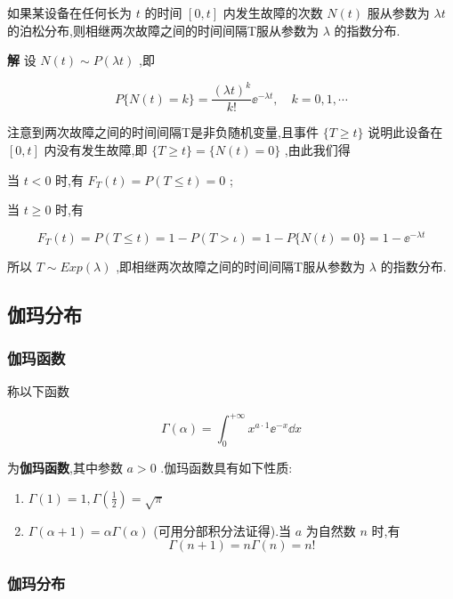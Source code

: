 \begin{example}\label{exam:2.5.10}
	如果某设备在任何长为 $ t $ 的时间 $ [0,t] $ 内发生故障的次数 $ N(t) $ 服从参数为 $ \lambda t $ 的泊松分布,则相继两次故障之间的时间间隔T服从参数为 $ \lambda $ 的指数分布.
	
	\textbf{解} 设 $ N(t) \sim P(\lambda t) $ ,即
	
	\[
	P\{N(t)=k\}=\frac{(\lambda t)^{k}}{k !} \ee ^{-\lambda t}, \quad k=0,1, \cdots
	\]
	
	注意到两次故障之间的时间间隔T是非负随机变量,且事件 $ \{T \geqslant t\} $ 说明此设备在 $ [0,t] $ 内没有发生故障,即 $ \{T \geqslant t\}=\{N(t)=0\} $ ,由此我们得
	
	当 $ t<0 $ 时,有 $ F_{T}(t)=P(T \leqslant t)=0 $ ;
	
	当 $ t \geqslant 0 $ 时,有
	
	\[
	F_{T}(t)=P(T \leqslant t)=1-P(T>\iota)=1-P\{N(t)=0\}=1-\ee ^{-\lambda t}
	\]
	
	所以 $ T \sim E x p(\lambda) $ ,即相继两次故障之间的时间间隔T服从参数为 $ \lambda $ 的指数分布.
\end{example}

\subsection{伽玛分布}\label{ssec:2.5.4}

\subsubsection{伽玛函数}

称以下函数

\begin{equation}
\Gamma(\alpha)=\int_{0}^{+\infty} x^{a \cdot 1} \ee ^{-x} \dd x \label{eq:2.5.11}
\end{equation}

为\textbf{伽玛函数},其中参数 $ a>0 $ .伽玛函数具有如下性质:

\begin{enumerate}
	\item $ \Gamma(1)=1, \Gamma\left(\frac{1}{2}\right)=\sqrt{\pi} $ 
	\item $ \Gamma(\alpha+1)=\alpha \Gamma(\alpha) $ (可用分部积分法证得).当 $ a $ 为自然数 $ n $ 时,有
	\[
	\Gamma(n+1)=n \Gamma(n)=n !
	\]
\end{enumerate}

\subsubsection{伽玛分布}

